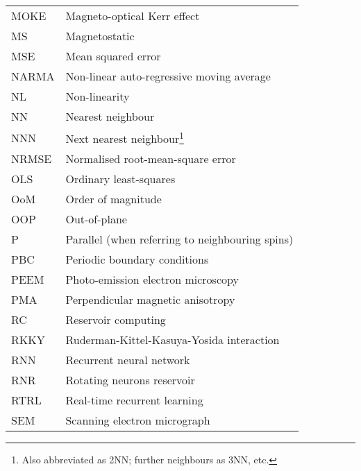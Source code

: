 {\begin{longtable}[l]{ll}
        MOKE  & Magneto-optical Kerr effect                 \\
        MS    & Magnetostatic                               \\
        MSE   & Mean squared error                          \\
        NARMA & Non-linear auto-regressive moving average   \\
        NL    & Non-linearity                               \\
        NN    & Nearest neighbour                           \\
        NNN   & Next nearest neighbour\footnote{Also abbreviated as 2NN; further neighbours as 3NN, etc.} \\
        NRMSE & Normalised root-mean-square error           \\
        OLS   & Ordinary least-squares                      \\
        OoM   & Order of magnitude                          \\
        OOP   & Out-of-plane                                \\
        P     & Parallel (when referring to neighbouring spins) \\
        PBC   & Periodic boundary conditions                \\
        PEEM  & Photo-emission electron microscopy          \\
        PMA   & Perpendicular magnetic anisotropy           \\
        RC    & Reservoir computing                         \\
        RKKY  & Ruderman-Kittel-Kasuya-Yosida interaction   \\
        RNN   & Recurrent neural network                    \\
        RNR   & Rotating neurons reservoir                  \\
        RTRL  & Real-time recurrent learning                \\
        SEM   & Scanning electron micrograph                \\

\end{longtable}}
